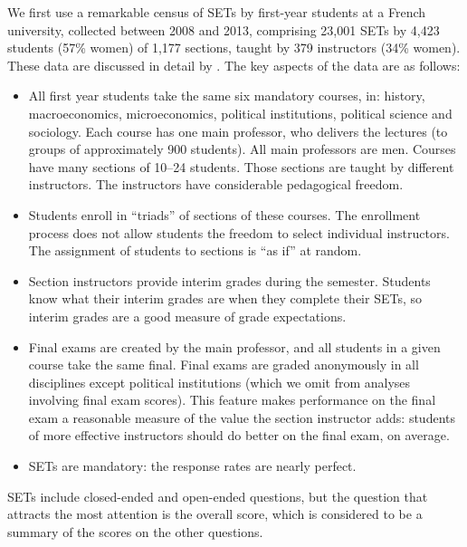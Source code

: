 \documentclass[12pt]{article}
\begin{document}
We first use a remarkable census of SETs by first-year students at a French university, collected between 2008 and 2013, 
comprising 23,001 SETs by
4,423 students (57\% women) of 1,177
sections, taught by 379 instructors (34\% women). These data are discussed in detail by \citet{Boring2015}.
The key aspects of the data are as follows:
\begin{itemize}
   \item All first year students take the same six mandatory courses, in: history, macroeconomics, microeconomics, 
            political institutions, political science and sociology.
            Each course has one main professor,
            who delivers the lectures (to groups of approximately 900 students). All main professors are men.
            Courses have many sections of 10--24 students. 
            Those sections are taught by different instructors.
            The instructors have considerable pedagogical freedom.
    
   \item Students enroll in ``triads'' of sections of these courses. 
            The enrollment process
            does not allow students the freedom to select individual instructors.
            The assignment of students to sections is ``as if'' at random.
            
   \item Section instructors provide interim grades during the semester. 
            Students know what their interim grades are when they complete their SETs, so interim grades are a 
            good measure of grade expectations.
            
   \item Final exams are created by the main professor, and all students in a given course take the
            same final. Final exams are graded anonymously in all disciplines except political
            institutions (which we omit from analyses involving final exam scores).
            This feature makes performance on the final exam a reasonable measure of the value the
            section instructor adds: students of more effective instructors should do better on
            the final exam, on average.
    
   \item SETs are mandatory: the response rates are nearly perfect.
   
\end{itemize}

SETs include closed-ended and open-ended questions, 
but the question that attracts the most attention is the overall
score, which is considered to be a summary 
of the scores on the other questions. 
\end{document}
